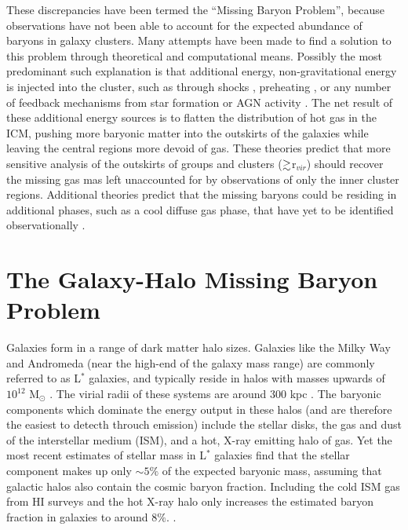 These discrepancies have been termed the ``Missing Baryon Problem'',
because observations have not been able to account for the expected
abundance of baryons in galaxy clusters. Many attempts have been made
to find a solution to this problem through theoretical and
computational means. Possibly the most predominant such explanation is
that additional energy, non-gravitational energy is injected into the
cluster, such as through shocks \citep{Takizawa1998}, preheating
\citep{Bialek2001}, or any number of feedback mechanisms from star
formation or AGN activity \citep{Metzler1994, McCarthy2007,
  Bode2009}. The net result of these additional energy sources is to
flatten the distribution of hot gas in the ICM, pushing more
baryonic matter into the outskirts of the galaxies while leaving the
central regions more devoid of gas. These theories predict that more
sensitive analysis of the outskirts of groups and clusters
($\gtrsim$r$_{vir}$) should recover the missing gas mas left unaccounted
for by observations of only the inner cluster regions. Additional
theories predict that the missing baryons could be residing in
additional phases, such as a cool diffuse gas phase, that have yet to
be identified observationally \citep{Afshordi2007, Bonamente2005}. 



\section{The Galaxy-Halo Missing Baryon Problem}
\label{s.Missing.Galaxies}


Galaxies form in a range of dark matter halo sizes. Galaxies like the
Milky Way and Andromeda (near the high-end of the galaxy mass range)
are commonly referred to as L$^*$ galaxies, and typically reside in
halos with masses upwards of $10^{12}$ M$_\odot$
\citep{Moster2010}. The virial radii of these systems are around 300
kpc \citep{Werk2014}. The baryonic components which dominate the energy output in these
halos (and are therefore the easiest to detecth throuch emission)
include the stellar disks, the gas and dust of the interstellar medium
(ISM), and a hot, X-ray emitting halo of gas. Yet the most recent
estimates of stellar mass in L$^*$ galaxies \citep{Behroozi2010} find
that the stellar component makes up only $\sim5\%$ of the expected
baryonic mass, assuming that galactic halos also contain the cosmic
baryon fraction. Including the cold ISM gas from HI surveys and the
hot X-ray halo \citep[][respectively]{Martin2010, Gupta2012} only
increases the estimated baryon fraction in galaxies to around
$8\%$. .


